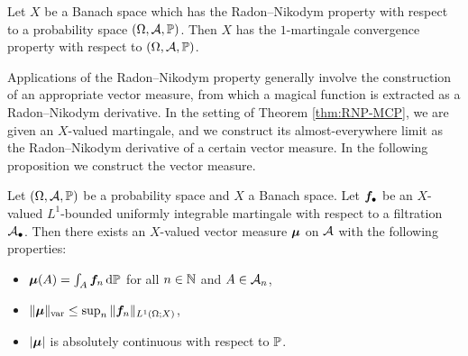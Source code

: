 \begin{thm}\label{thm:RNP-MCP}
  Let $X$ be a Banach space which has the Radon--Nikodym property with respect to a probability space $(\Omega,\mc{A},\P)$.
  Then $X$ has the $1$-martingale convergence property with respect to $(\Omega,\mc{A},\P)$.
\end{thm}

Applications of the Radon--Nikodym property generally involve the construction of an appropriate vector measure, from which a magical function is extracted as a Radon--Nikodym derivative.
In the setting of Theorem \ref{thm:RNP-MCP}, we are given an $X$-valued martingale, and we construct its almost-everywhere limit as the Radon--Nikodym derivative of a certain vector measure.
In the following proposition we construct the vector measure.

\begin{prop}\label{prop:martingale-measure} 
  Let $(\Omega,\mc{A},\P)$ be a probability space and $X$ a Banach space.
  Let $\mb{f}_{\bullet}$ be an $X$-valued $L^1$-bounded uniformly integrable martingale with respect to a filtration $\mc{A}_{\bullet}$.
  Then there exists an $X$-valued vector measure $\mb{\mu}$ on $\mc{A}$ with the following properties:
  \begin{itemize}
  \item $\mb{\mu}(A) = \int_{A} \mb{f}_n \, \dd\P$ for all $n \in \N$ and $A \in \mc{A}_{n}$,
  \item $\|\mb{\mu}\|_{\var} \leq \sup_{n} \|\mb{f}_n\|_{L^1(\Omega;X)}$,
  \item $|\mb{\mu}|$ is absolutely continuous with respect to $\P$.
  \end{itemize}
\end{prop}

